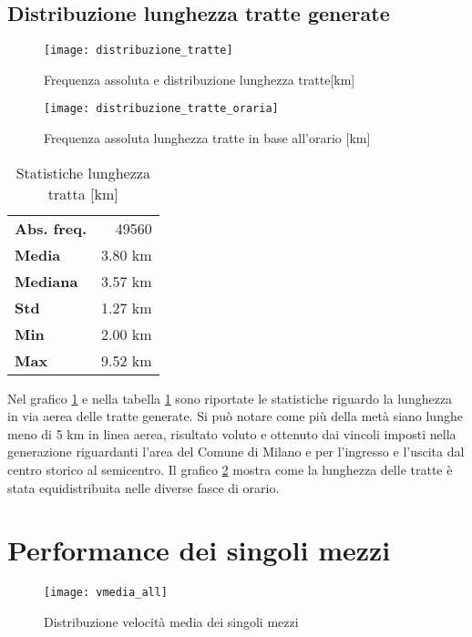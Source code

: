 \subsection{Distribuzione lunghezza tratte generate}

\begin{figure}[H]
\texttt{[image: distribuzione\_tratte]}
\caption{Frequenza assoluta e distribuzione lunghezza tratte[km]}
\label{image:2}
\end{figure}

\begin{figure}[H]
	\texttt{[image: distribuzione\_tratte\_oraria]}
	\caption{Frequenza assoluta lunghezza tratte in base all'orario [km]}
	\label{image:19}
\end{figure}

\begin{table}[H]
\centering
\begin{tabular}{ | l r | }
\hline
\textbf{Abs. freq.} & 49560 \\
\textbf{Media} & 3.80 km \\
\textbf{Mediana} & 3.57 km \\
\textbf{Std} & 1.27 km \\
\textbf{Min} & 2.00 km \\
\textbf{Max} & 9.52 km \\
\hline
\end{tabular}
\caption{Statistiche lunghezza tratta [km]}
\label{table:2}
\end{table}

Nel grafico \ref{image:2} e nella tabella \ref{table:2} sono riportate le statistiche riguardo la lunghezza in via aerea delle tratte generate. Si può notare come più della metà siano lunghe meno di 5 km in linea aerea, risultato voluto e ottenuto dai vincoli imposti nella generazione riguardanti l'area del Comune di Milano e per l'ingresso e l'uscita dal centro storico al semicentro. Il grafico \ref{image:19} mostra come la lunghezza delle tratte è stata equidistribuita nelle diverse fasce di orario.

\section{Performance dei singoli mezzi}

\begin{figure}[H]
	\texttt{[image: vmedia\_all]}
	\caption{Distribuzione velocità media dei singoli mezzi}
	\label{image:26}
\end{figure}

